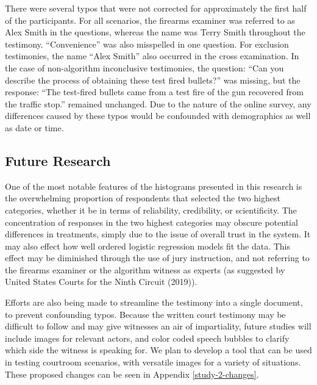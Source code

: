 \documentclass[print]{nuthesis}
\begin{document}
There were several typos that were not corrected for approximately the first half of the participants.
For all scenarios, the firearms examiner was referred to as Alex Smith in the questions, whereas the name was Terry Smith throughout the testimony.
``Convenience'' was also misspelled in one question.
For exclusion testimonies, the name ``Alex Smith'' also occurred in the cross examination.
In the case of non-algorithm inconclusive testimonies, the question: ``Can you describe the process of obtaining these test fired bullets?'' was missing, but the response: ``The test-fired bullets came from a test fire of the gun recovered from the traffic stop.'' remained unchanged.
Due to the nature of the online survey, any differences caused by these typos would be confounded with demographics as well as date or time.

\hypertarget{future-research}{%
\subsection{Future Research}\label{future-research}}

One of the most notable features of the histograms presented in this research is the overwhelming proportion of respondents that selected the two highest categories, whether it be in terms of reliability, credibility, or scientificity.
The concentration of responses in the two highest categories may obscure potential differences in treatments, simply due to the issue of overall trust in the system.
It may also effect how well ordered logistic regression models fit the data.
This effect may be diminished through the use of jury instruction, and not referring to the firearms examiner or the algorithm witness as experts (as suggested by United States Courts for the Ninth Circuit (2019)).

Efforts are also being made to streamline the testimony into a single document, to prevent confounding typos.
Because the written court testimony may be difficult to follow and may give witnesses an air of impartiality, future studies will include images for relevant actors, and color coded speech bubbles to clarify which side the witness is speaking for.
We plan to develop a tool that can be used in testing courtroom scenarios, with versatile images for a variety of situations. These proposed changes can be seen in Appendix \ref{study-2-changes}.
\end{document}
